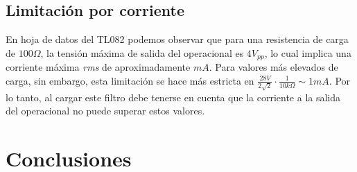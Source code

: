 \documentclass[../../tc_tp3_main.tex]{subfiles}
\begin{document}
\subsection{Limitaci\'on por corriente}

En hoja de datos del TL082 podemos observar que para una resistencia de carga de $100\Omega$, la tensi\'on m\'axima de salida del operacional es $4V_{pp}$, lo cual implica una corriente m\'axima \textit{rms} de aproximadamente $mA$. Para valores m\'as elevados de carga, sin embargo, esta limitaci\'on se hace m\'as estricta en $\frac{28V}{2\sqrt{2}} \cdot \frac{1}{10k\Omega} \sim 1mA$. Por lo tanto, al cargar este filtro debe tenerse en cuenta que la corriente a la salida del operacional no puede superar estos valores.


\section{Conclusiones}
\end{document}
